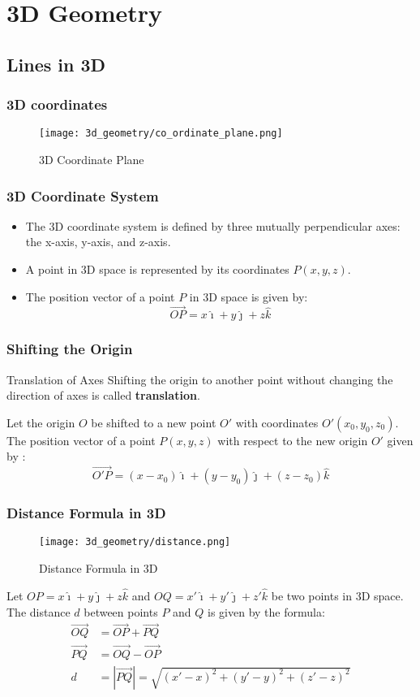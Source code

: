 \section{3D Geometry}
\label{sec:3d_geometry}

\subsection{Lines in 3D}
\begin{frame}
    \frametitle{3D coordinates}
    \begin{figure}
        \texttt{[image: 3d\_geometry/co\_ordinate\_plane.png]}
        \caption{3D Coordinate Plane}
    \end{figure}
\end{frame}

\begin{frame}
    \frametitle{3D Coordinate System}
    \begin{itemize}
        \item The 3D coordinate system is defined by three mutually perpendicular axes: the x-axis, y-axis, and z-axis.
        \item A point in 3D space is represented by its coordinates \(P(x, y, z)\).
        \item The position vector of a point \(P\) in 3D space is given by:
        \[
        \vec{OP} = x\hat{\imath} + y\hat{\jmath} + z\hat{k}
        \]
    \end{itemize}       
\end{frame}

\begin{frame}
    \frametitle{Shifting the Origin}
    \begin{block}{Translation of Axes}
        Shifting the origin  to another point without changing the direction of axes is called \textbf{translation}.
    \end{block}
   Let the origin \(O\) be shifted to a new point \(O'\) with coordinates \(O'(x_0, y_0, z_0)\). The position vector of a point \(P(x,y,z)\) with respect to the new origin \(O'\) given by :
    \[
        \vec{O'P} = (x - x_0)\hat{\imath} + (y - y_0)\hat{\jmath} + (z - z_0)\hat{k}
    \]
\end{frame}

\begin{frame}
\frametitle{Distance Formula in 3D}
\begin{figure}
    \texttt{[image: 3d\_geometry/distance.png]}
    \caption{Distance Formula in 3D}
\end{figure}
Let \(OP = x \hat{\imath} + y \hat{\jmath} + z \hat{k}\)  and \(OQ = x' \hat{\imath} + y' \hat{\jmath} + z' \hat{k}\) be two points in 3D space. The distance \(d\) between points \(P\) and \(Q\) is given by the formula:
\begin{align*}
    \vec{OQ} &= \vec{OP} + \vec{PQ} \\
    \vec{PQ} &= \vec{OQ} - \vec{OP} \\
    d &= |\vec{PQ}| = \sqrt{(x' - x)^2 + (y' - y)^2 + (z' - z)^2}
\end{align*}
\end{frame}


